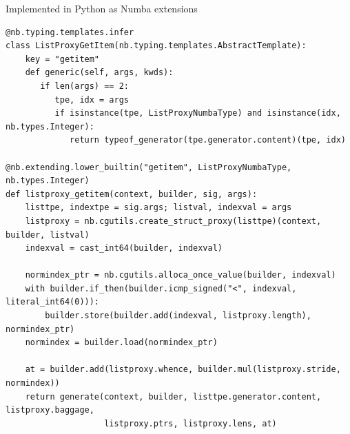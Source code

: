 \documentclass[aspectratio=169]{beamer}
\begin{document}
\begin{frame}[fragile]{Implemented in Python as Numba extensions}
\vspace{0.15 cm}
\scriptsize
\begin{verbatim}
@nb.typing.templates.infer
class ListProxyGetItem(nb.typing.templates.AbstractTemplate):
    key = "getitem"
    def generic(self, args, kwds):
       if len(args) == 2:
          tpe, idx = args
          if isinstance(tpe, ListProxyNumbaType) and isinstance(idx, nb.types.Integer):
             return typeof_generator(tpe.generator.content)(tpe, idx)

@nb.extending.lower_builtin("getitem", ListProxyNumbaType, nb.types.Integer)
def listproxy_getitem(context, builder, sig, args):
    listtpe, indextpe = sig.args; listval, indexval = args
    listproxy = nb.cgutils.create_struct_proxy(listtpe)(context, builder, listval)
    indexval = cast_int64(builder, indexval)

    normindex_ptr = nb.cgutils.alloca_once_value(builder, indexval)
    with builder.if_then(builder.icmp_signed("<", indexval, literal_int64(0))):
        builder.store(builder.add(indexval, listproxy.length), normindex_ptr)
    normindex = builder.load(normindex_ptr)

    at = builder.add(listproxy.whence, builder.mul(listproxy.stride, normindex))
    return generate(context, builder, listtpe.generator.content, listproxy.baggage,
                    listproxy.ptrs, listproxy.lens, at)
\end{verbatim}
\end{frame}
\end{document}
